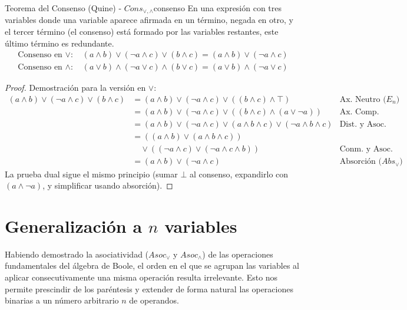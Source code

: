 \begin{teorema}{Teorema del Consenso (Quine) - $Cons_{\vee, \wedge}$}{consenso}
En una expresión con tres variables donde una variable aparece afirmada en un término, negada en otro, y el tercer término (el consenso) está formado por las variables restantes, este último término es redundante.
\begin{align*}
    \text{Consenso en $\vee$: } & (a \wedge b) \vee (\neg a \wedge c) \vee (b \wedge c) = (a \wedge b) \vee (\neg a \wedge c) \\
    \text{Consenso en $\wedge$: } & (a \vee b) \wedge (\neg a \vee c) \wedge (b \vee c) = (a \vee b) \wedge (\neg a \vee c)
\end{align*}
\tcblower
\begin{proof}
Demostración para la versión en $\vee$:
\begin{align*}
    (a \wedge b) \vee (\neg a \wedge c) \vee (b \wedge c) &= (a \wedge b) \vee (\neg a \wedge c) \vee ((b \wedge c) \wedge \top) & \text{Ax. Neutro ($E_n$)} \\
    &= (a \wedge b) \vee (\neg a \wedge c) \vee ((b \wedge c) \wedge (a \vee \neg a)) & \text{Ax. Comp.} \\
    &= (a \wedge b) \vee (\neg a \wedge c) \vee (a \wedge b \wedge c) \vee (\neg a \wedge b \wedge c) & \text{Dist. y Asoc.} \\
    &= ((a \wedge b) \vee (a \wedge b \wedge c)) \\
    &\quad \vee ((\neg a \wedge c) \vee (\neg a \wedge c \wedge b)) & \text{Conm. y Asoc.} \\
    &= (a \wedge b) \vee (\neg a \wedge c) & \text{Absorción ($Abs_{\vee}$)}
\end{align*}
La prueba dual sigue el mismo principio (sumar $\bot$ al consenso, expandirlo con $(a \wedge \neg a)$, y simplificar usando absorción).
\end{proof}
\end{teorema}

\section{Generalización a $n$ variables}

Habiendo demostrado la asociatividad ($Asoc_\vee$ y $Asoc_\wedge$) de las operaciones fundamentales del álgebra de Boole, el orden en el que se agrupan las variables al aplicar consecutivamente una misma operación resulta irrelevante. Esto nos permite prescindir de los paréntesis y extender de forma natural las operaciones binarias a un número arbitrario $n$ de operandos.

